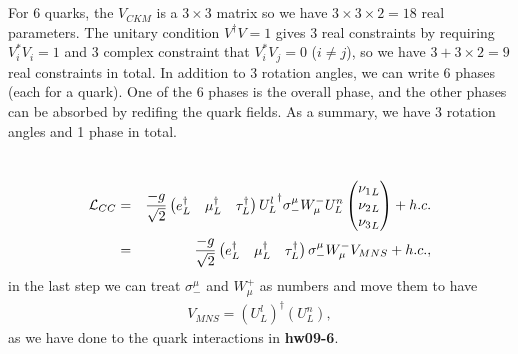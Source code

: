 \documentclass[11pt]{article}
\begin{document}
\section{ }
For 6 quarks, the $V_{CKM}$ is a $3 \times 3$ matrix so we have $3\times 3 \times 2=18$ real parameters.  The unitary condition $V^\dagger V=1$ gives 3 real constraints by requiring $V_i^* V_i=1$ and 3 complex constraint that $V_i^* V_j=0$ ($i \neq j$), so we have $3+3\times 2= 9$ real constraints in total. In addition to 3 rotation angles, we can write 6 phases (each for a quark). One of the 6 phases is the overall phase, and the other phases can be absorbed by redifing the quark fields. As a summary, we have 3 rotation angles and 1 phase in total.


\section{ }
\begin{eqnarray}
    {\cal L}_{CC} &=&  \frac{-g}{\sqrt2}
    \begin{pmatrix}
      e_L^\dagger &\mu_L^\dagger & \tau_L^\dagger
    \end{pmatrix}
    {U^l_L}^\dagger \sigma_-^\mu W^-_\mu U^n_L
    \begin{pmatrix}
      {\nu_1}_L \\ {\nu_2}_L \\ {\nu_3}_L
    \end{pmatrix}
      + h.c. \\ 
    &=& \frac{-g}{\sqrt2} 
    \begin{pmatrix}
      e_L^\dagger & \mu_L^\dagger & \tau_L^\dagger
    \end{pmatrix}
    \sigma_-^\mu W^-_\mu V_{MNS} + h.c.,
  \end{eqnarray}
in the last step we can treat $\sigma_-^\mu$ and $W^+_\mu$ as numbers and move them to have 
\begin{eqnarray}
    V_{MNS} = (U^l_L)^\dagger (U^n_L),
\end{eqnarray}
as we have done to the quark interactions in {\bf hw09-6}.
\end{document}
